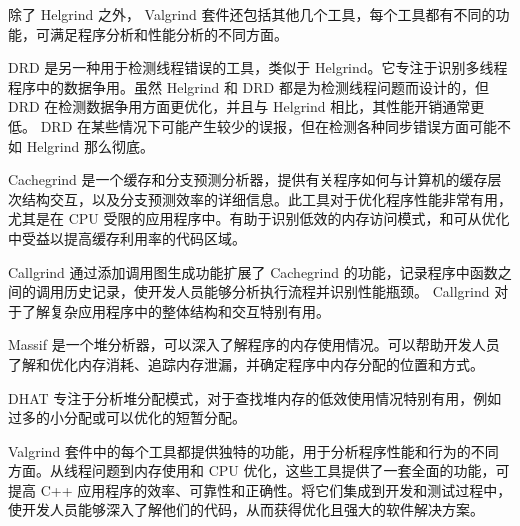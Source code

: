 
除了 Helgrind 之外， Valgrind 套件还包括其他几个工具，每个工具都有不同的功能，可满足程序分析和性能分析的不同方面。


DRD 是另一种用于检测线程错误的工具，类似于 Helgrind。它专注于识别多线程程序中的数据争用。虽然 Helgrind 和 DRD 都是为检测线程问题而设计的，但 DRD 在检测数据争用方面更优化，并且与 Helgrind 相比，其性能开销通常更低。 DRD 在某些情况下可能产生较少的误报，但在检测各种同步错误方面可能不如 Helgrind 那么彻底。


Cachegrind 是一个缓存和分支预测分析器，提供有关程序如何与计算机的缓存层次结构交互，以及分支预测效率的详细信息。此工具对于优化程序性能非常有用，尤其是在 CPU 受限的应用程序中。有助于识别低效的内存访问模式，和可从优化中受益以提高缓存利用率的代码区域。


Callgrind 通过添加调用图生成功能扩展了 Cachegrind 的功能，记录程序中函数之间的调用历史记录，使开发人员能够分析执行流程并识别性能瓶颈。 Callgrind 对于了解复杂应用程序中的整体结构和交互特别有用。


Massif 是一个堆分析器，可以深入了解程序的内存使用情况。可以帮助开发人员了解和优化内存消耗、追踪内存泄漏，并确定程序中内存分配的位置和方式。


DHAT 专注于分析堆分配模式，对于查找堆内存的低效使用情况特别有用，例如过多的小分配或可以优化的短暂分配。

Valgrind 套件中的每个工具都提供独特的功能，用于分析程序性能和行为的不同方面。从线程问题到内存使用和 CPU 优化，这些工具提供了一套全面的功能，可提高 C++ 应用程序的效率、可靠性和正确性。将它们集成到开发和测试过程中，使开发人员能够深入了解他们的代码，从而获得优化且强大的软件解决方案。
